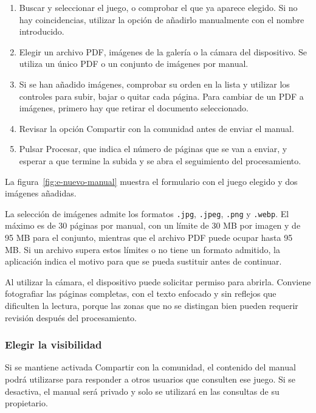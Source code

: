 \begin{enumerate}
    \item Buscar y seleccionar el juego, o comprobar el que ya aparece
    elegido. Si no hay coincidencias, utilizar la opción de añadirlo
    manualmente con el nombre introducido.
    \item Elegir un archivo \acs{PDF}, imágenes de la galería o la cámara
    del dispositivo. Se utiliza un único \acs{PDF} o un conjunto de
    imágenes por manual.
    \item Si se han añadido imágenes, comprobar su orden en la lista y
    utilizar los controles para subir, bajar o quitar cada página. Para
    cambiar de un \acs{PDF} a imágenes, primero hay que retirar el documento
    seleccionado.
    \item Revisar la opción
    \guillemotleft{}Compartir con la comunidad\guillemotright{} antes de
    enviar el manual.
    \item Pulsar \guillemotleft{}Procesar\guillemotright{}, que indica el número de
    páginas que se van a enviar, y esperar a que termine la subida y se
    abra el seguimiento del procesamiento.
\end{enumerate}

La figura~\ref{fig:e-nuevo-manual} muestra el formulario con el juego
elegido y dos imágenes añadidas.


La selección de imágenes admite los formatos \texttt{.jpg},
\texttt{.jpeg}, \texttt{.png} y \texttt{.webp}. El máximo es de 30 páginas
por manual, con un límite de 30 MB por imagen y de 95 MB para el conjunto,
mientras que el archivo \acs{PDF} puede ocupar hasta 95 MB. Si un archivo
supera estos límites o no tiene un formato admitido, la aplicación indica
el motivo para que se pueda sustituir antes de continuar.

Al utilizar la cámara, el dispositivo puede solicitar permiso para
abrirla. Conviene fotografiar las páginas completas, con el texto enfocado
y sin reflejos que dificulten la lectura, porque las zonas que no se
distingan bien pueden requerir revisión después del procesamiento.

\subsubsection{Elegir la visibilidad}
\label{sec:e-visibilidad}

Si se mantiene activada
\guillemotleft{}Compartir con la comunidad\guillemotright{}, el contenido
del manual podrá utilizarse para responder a otros usuarios que consulten
ese juego. Si se desactiva, el manual será privado y solo se utilizará en
las consultas de su propietario.

